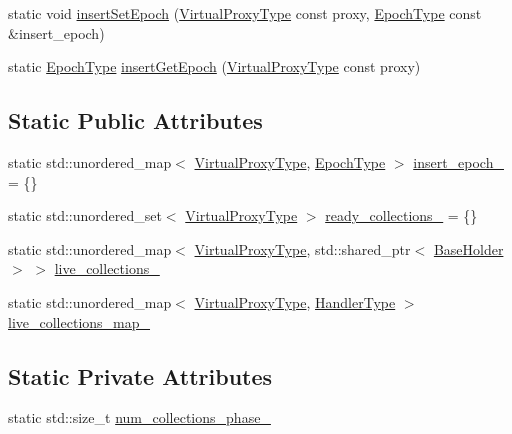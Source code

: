 \begin{DoxyCompactItemize}
\item 
static void \hyperlink{structvt_1_1vrt_1_1collection_1_1_universal_index_holder_a8193db85d822ff2783925ef2a5ac3b17}{insert\+Set\+Epoch} (\hyperlink{namespacevt_a1b417dd5d684f045bb58a0ede70045ac}{Virtual\+Proxy\+Type} const proxy, \hyperlink{namespacevt_a985a5adf291c34a3ca263b3378388236}{Epoch\+Type} const \&insert\+\_\+epoch)
\item 
static \hyperlink{namespacevt_a985a5adf291c34a3ca263b3378388236}{Epoch\+Type} \hyperlink{structvt_1_1vrt_1_1collection_1_1_universal_index_holder_a45b646ebb0be1787d3893f4e719ed031}{insert\+Get\+Epoch} (\hyperlink{namespacevt_a1b417dd5d684f045bb58a0ede70045ac}{Virtual\+Proxy\+Type} const proxy)
\end{DoxyCompactItemize}
\subsection*{Static Public Attributes}
\begin{DoxyCompactItemize}
\item 
static std\+::unordered\+\_\+map$<$ \hyperlink{namespacevt_a1b417dd5d684f045bb58a0ede70045ac}{Virtual\+Proxy\+Type}, \hyperlink{namespacevt_a985a5adf291c34a3ca263b3378388236}{Epoch\+Type} $>$ \hyperlink{structvt_1_1vrt_1_1collection_1_1_universal_index_holder_a9fbea00587a7d5028c3ae3cf124a3930}{insert\+\_\+epoch\+\_\+} = \{\}
\item 
static std\+::unordered\+\_\+set$<$ \hyperlink{namespacevt_a1b417dd5d684f045bb58a0ede70045ac}{Virtual\+Proxy\+Type} $>$ \hyperlink{structvt_1_1vrt_1_1collection_1_1_universal_index_holder_a68ef587e677d634684e27732e9cbf8e8}{ready\+\_\+collections\+\_\+} = \{\}
\item 
static std\+::unordered\+\_\+map$<$ \hyperlink{namespacevt_a1b417dd5d684f045bb58a0ede70045ac}{Virtual\+Proxy\+Type}, std\+::shared\+\_\+ptr$<$ \hyperlink{structvt_1_1vrt_1_1collection_1_1_base_holder}{Base\+Holder} $>$ $>$ \hyperlink{structvt_1_1vrt_1_1collection_1_1_universal_index_holder_af67ddae79d782cc9c51a13e34997cd59}{live\+\_\+collections\+\_\+}
\item 
static std\+::unordered\+\_\+map$<$ \hyperlink{namespacevt_a1b417dd5d684f045bb58a0ede70045ac}{Virtual\+Proxy\+Type}, \hyperlink{namespacevt_af64846b57dfcaf104da3ef6967917573}{Handler\+Type} $>$ \hyperlink{structvt_1_1vrt_1_1collection_1_1_universal_index_holder_a42b948be40223918c12a531e2f7a290e}{live\+\_\+collections\+\_\+map\+\_\+}
\end{DoxyCompactItemize}
\subsection*{Static Private Attributes}
\begin{DoxyCompactItemize}
\item 
static std\+::size\+\_\+t \hyperlink{structvt_1_1vrt_1_1collection_1_1_universal_index_holder_ab07d976281f76b772732431484120be4}{num\+\_\+collections\+\_\+phase\+\_\+}
\end{DoxyCompactItemize}


